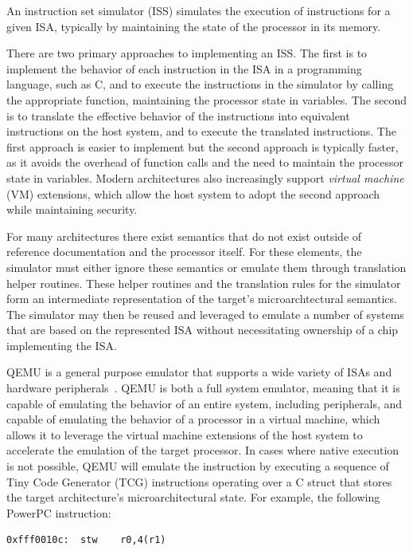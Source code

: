 An instruction set simulator (ISS) simulates the execution of instructions for a given ISA, typically by maintaining the state of the processor in its memory.

There are two primary approaches to implementing an ISS.
The first is to implement the behavior of each instruction in the ISA in a programming language, such as C, and to execute the instructions in the simulator by calling the appropriate function, maintaining the processor state in variables.
The second is to translate the effective behavior of the instructions into equivalent instructions on the host system, and to execute the translated instructions.
The first approach is easier to implement but the second approach is typically faster, as it avoids the overhead of function calls and the need to maintain the processor state in variables.
Modern architectures also increasingly support \emph{virtual machine} (VM) extensions, which allow the host system to adopt the second approach while maintaining security.

For many architectures there exist semantics that do not exist outside of reference documentation and the processor itself.
For these elements, the simulator must either ignore these semantics or emulate them through translation helper routines.
These helper routines and the translation rules for the simulator form an intermediate representation of the target's microarchtectural semantics.
The simulator may then be reused and leveraged to emulate a number of systems that are based on the represented ISA without necessitating ownership of a chip implementing the ISA.

\begin{example}[QEMU]
\end{example}
QEMU is a general purpose emulator that supports a wide variety of ISAs and hardware peripherals~\cite{bellard2005qemu}.
QEMU is both a full system emulator, meaning that it is capable of emulating the behavior of an entire system, including peripherals, and capable of emulating the behavior of a processor in a virtual machine, which allows it to leverage the virtual machine extensions of the host system to accelerate the emulation of the target processor.
In cases where native execution is not possible, QEMU will emulate the instruction by executing a sequence of Tiny Code Generator (TCG) instructions operating over a C struct that stores the target architecture's microarchitectural state.
For example, the following PowerPC instruction:

\begin{center}
\begin{lstlisting}[]
0xfff0010c:  stw    r0,4(r1)
\end{lstlisting}
\end{center}

